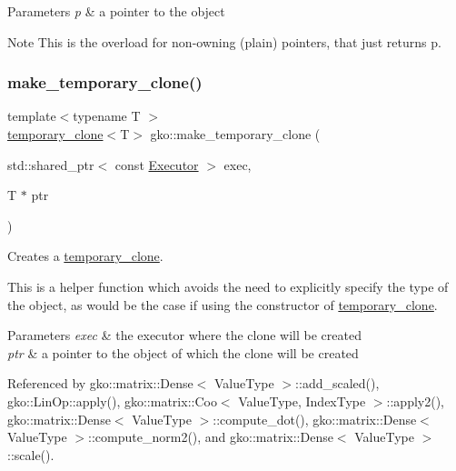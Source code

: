 \begin{DoxyParams}{Parameters}
{\em p} & a pointer to the object\\
\hline
\end{DoxyParams}
\begin{DoxyNote}{Note}
This is the overload for non-\/owning (plain) pointers, that just returns {\ttfamily p}. 
\end{DoxyNote}
\mbox{\label{namespacegko_aa9c0782fb35cc18cb404716d9b6f2c0e}} 
\subsubsection{\texorpdfstring{make\+\_\+temporary\+\_\+clone()}{make\_temporary\_clone()}}
{\footnotesize\ttfamily template$<$typename T $>$ \\
\hyperlink{classgko_1_1temporary__clone}{temporary\+\_\+clone}$<$T$>$ gko\+::make\+\_\+temporary\+\_\+clone (\begin{DoxyParamCaption}\item[{std\+::shared\+\_\+ptr$<$ const \hyperlink{classgko_1_1Executor}{Executor} $>$}]{exec,  }\item[{T $\ast$}]{ptr }\end{DoxyParamCaption})}



Creates a \hyperlink{classgko_1_1temporary__clone}{temporary\+\_\+clone}. 

This is a helper function which avoids the need to explicitly specify the type of the object, as would be the case if using the constructor of \hyperlink{classgko_1_1temporary__clone}{temporary\+\_\+clone}.


\begin{DoxyParams}{Parameters}
{\em exec} & the executor where the clone will be created \\
\hline
{\em ptr} & a pointer to the object of which the clone will be created \\
\hline
\end{DoxyParams}


Referenced by gko\+::matrix\+::\+Dense$<$ Value\+Type $>$\+::add\+\_\+scaled(), gko\+::\+Lin\+Op\+::apply(), gko\+::matrix\+::\+Coo$<$ Value\+Type, Index\+Type $>$\+::apply2(), gko\+::matrix\+::\+Dense$<$ Value\+Type $>$\+::compute\+\_\+dot(), gko\+::matrix\+::\+Dense$<$ Value\+Type $>$\+::compute\+\_\+norm2(), and gko\+::matrix\+::\+Dense$<$ Value\+Type $>$\+::scale().

